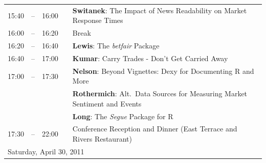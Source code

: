 \documentclass[letterpaper,10pt]{article}
\newcommand{\mylinecolor}[1]{\color{#1}\vspace{-8pt}}  %
\begin{document}
\begin{tabular}{rlrlp{5in}}
  15:40 & -- & 16:00 &    & \textbf{\color{Talk} Switanek}: \small{The Impact of News Readability on Market Response Times} \\
  16:00 & -- & 16:20 &    & \small{\mylinecolor{Breaks} Break} \\
  16:20 & -- & 16:40 &    & \textbf{\color{Talk} Lewis}: \small{The \emph{betfair} Package} \\
  16:40 & -- & 17:00 &    & \textbf{\color{Talk} Kumar}: \small{Carry Trades - Don't Get Carried Away} \\
  17:00 & -- & 17:30 &    & \textbf{\color{LightningTalk} Nelson}: \small{Beyond Vignettes: Dexy for Documenting R and More} \\
         &    &        &    & \textbf{\color{LightningTalk}  Rothermich}: \small{Alt.~Data Sources for Measuring Market Sentiment and Events} \\
         &    &        &    & \textbf{\color{LightningTalk} Long}: \small{The \emph{Segue} Package for R} \\
  17:30 & -- & 22:00 &    & \small{\mylinecolor{Breaks} Conference Reception and Dinner (East Terrace and Rivers Restaurant)}  \\[18pt]

  \multicolumn{5}{l}{\large Saturday, April 30, 2011} \\[10pt]


\end{tabular}
\end{document}

